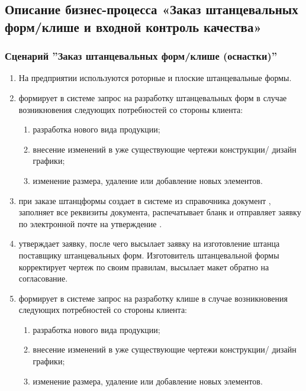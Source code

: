 \subsection{Описание бизнес-процесса «Заказ штанцевальных форм/клише и входной контроль качества»}
\label{bp:toolrequest}

\subsubsection{Сценарий ''Заказ штанцевальных форм/клише (оснастки)''}
\label{bp:toolrequest_1}

\begin{enumerate}

\item На предприятии используются роторные и плоские штанцевальные формы.
\item \manager	 формирует в системе \gofro запрос на разработку штанцевальных форм в случае возникновения следующих потребностей со стороны клиента:
\begin{enumerate}
\item   	разработка нового вида продукции;
\item   	внесение изменений в уже существующие чертежи конструкции/ дизайн графики;
\item   	изменение размера, удаление или добавление новых элементов.
\end{enumerate}

\item \tehnolog	при заказе штанцформы  создает в системе \gofro из справочника  документ , \tehnolog заполняет все реквизиты документа, распечатывает бланк и отправляет заявку по электронной почте на утверждение \director.


\item  \director утверждает заявку, после чего \tehnolog высылает заявку на изготовление штанца поставщику штанцевальных форм. Изготовитель штанцевальной формы корректирует чертеж по своим правилам, высылает макет обратно на согласование. 


\item \tehnolog формирует в системе \gofro запрос на разработку клише в случае возникновения следующих потребностей со стороны клиента:
\begin{enumerate}
\item    	разработка нового вида продукции;
\item    	внесение изменений в уже существующие чертежи конструкции/ дизайн графики;
\item    	изменение размера, удаление или добавление новых элементов.
\end{enumerate}



\end{enumerate}
